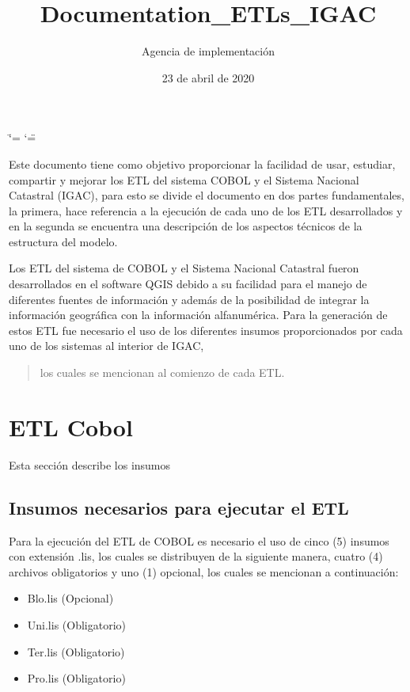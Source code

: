 \documentclass[letterpaper,10pt,spanish]{sphinxmanual}
\title{Documentation\_ETLs\_IGAC}
\date{23 de abril de 2020}
\author{Agencia de implementación}
\begin{document}
\ifdefined\shorthandoff
  \ifnum\catcode`\=\string=\active\shorthandoff{=}\fi
  \ifnum\catcode`\"=\active{}\fi
\fi

\pagestyle{empty}
\sphinxmaketitle
\pagestyle{plain}
\sphinxtableofcontents
\pagestyle{normal}
\label{\detokenize{index::doc}}


Este documento tiene como objetivo proporcionar la facilidad de usar, estudiar, compartir y mejorar los ETL del sistema COBOL
y el Sistema Nacional Catastral (IGAC), para esto se divide el documento en dos partes fundamentales, la primera, hace referencia
a la ejecución de cada uno de los ETL desarrollados y en la segunda se encuentra una descripción de los aspectos técnicos de la
estructura del modelo.

Los ETL del sistema de COBOL y el Sistema Nacional Catastral fueron desarrollados en el software QGIS debido a su facilidad para el
manejo de diferentes fuentes de información y además de la posibilidad de integrar la información geográfica con la información alfanumérica.
Para la generación de estos ETL fue necesario el uso de los diferentes insumos proporcionados por cada uno de los sistemas al interior de IGAC,
\begin{quote}

los cuales se mencionan al comienzo de cada ETL.
\end{quote}


\chapter{ETL Cobol}
\label{\detokenize{ETL Cobol:etl-cobol}}\label{\detokenize{ETL Cobol::doc}}
Esta sección describe los insumos


\section{Insumos necesarios para ejecutar el ETL}
\label{\detokenize{ETL_Cobol/supplies:insumos-necesarios-para-ejecutar-el-etl}}\label{\detokenize{ETL_Cobol/supplies::doc}}
Para la ejecución del ETL de COBOL es necesario el uso de cinco (5) insumos con extensión .lis, los cuales se distribuyen de la siguiente manera, cuatro (4) archivos obligatorios y uno (1) opcional, los cuales se mencionan a continuación:
\begin{itemize}
\item {} 
Blo.lis \sphinxhyphen{} (Opcional)

\item {} 
Uni.lis\sphinxhyphen{} (Obligatorio)

\item {} 
Ter.lis\sphinxhyphen{} (Obligatorio)

\item {} 
Pro.lis\sphinxhyphen{} (Obligatorio)

\end{itemize}
\end{document}
